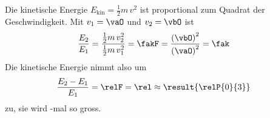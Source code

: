 Die kinetische Energie $E_\mathrm{kin} = \frac{1}{2}m\,v^2$ ist proportional zum Quadrat der Geschwindigkeit. Mit $v_1 = \vaO$ und $v_2 = \vbO$ ist
\begin{align}
 \frac{E_2}{E_1} &= \frac{\frac{1}{2}m\,v_2^2}{\frac{1}{2}m\,v_1^2} = \fakF = \frac{\left(\vbO\right)^2}{\left(\vaO\right)^2} = \fak
\end{align}
Die kinetische Energie nimmt also um
\begin{align}
 \frac{E_2-E_1}{E_1} &= \relF = \rel \approx \result{\relP{0}{3}}
\end{align}
zu, sie wird -mal so gross.
